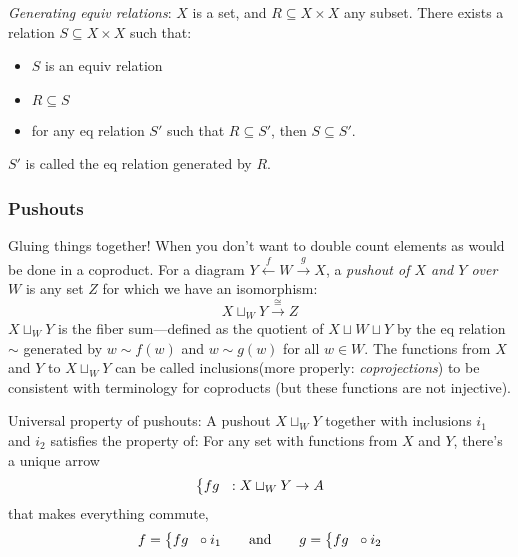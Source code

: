\documentclass{article}
\begin{document}
\emph{Generating equiv relations}:
$X$ is a set, and $R \subseteq X \times X$ any subset.
There exists a relation $S \subseteq X \times X$ such that:
\begin{itemize}
\item $S$ is an equiv relation
\item $R\subseteq S$
\item for any eq relation $S'$ such that $R\subseteq S'$, then $S\subseteq S'$.
\end{itemize}
$S'$ is called the eq relation generated by $R$.

\setcounter{subsubsection}{1}
\subsubsection{Pushouts}
Gluing things together! When you don't want to double count elements as would be done in a coproduct.
For a diagram $Y \stackrel{f}{\longleftarrow} W \stackrel{g}{\longrightarrow} X$,
a \emph{pushout of $X$ and $Y$ over $W$} is any set $Z$ for which we have an isomorphism:
\begin{equation*}
X \sqcup_W Y \stackrel{\cong}{\longrightarrow} Z
\end{equation*}
$X \sqcup_W Y$ is the fiber sum---defined as the quotient of $X\sqcup W\sqcup Y$ by the eq relation $\sim$ generated by $w \sim f(w)$ and $w \sim g(w)$ for all $w \in W$.
The functions from $X$ and $Y$ to $X \sqcup_W Y$ can be called inclusions(more properly: \emph{coprojections}) to be consistent with terminology for coproducts (but these functions are not injective).

Universal property of pushouts:
A pushout $X \sqcup_W Y$ together with inclusions $i_1$ and $i_2$ satisfies the property of:
For any set with functions from $X$ and $Y$, there's a unique arrow 
\begin{equation*}
\left\{\begin{array}{@{} l c @{}}f  g \end{array}\right. : X \sqcup_W Y \rightarrow A
\end{equation*}
that makes everything commute,
\begin{equation*}
f = \left\{\begin{array}{@{} l c @{}}f  g \end{array}\right. \circ i_1
\qquad \text{and} \qquad
g = \left\{\begin{array}{@{} l c @{}}f  g \end{array}\right. \circ i_2
\end{equation*}
\end{document}
